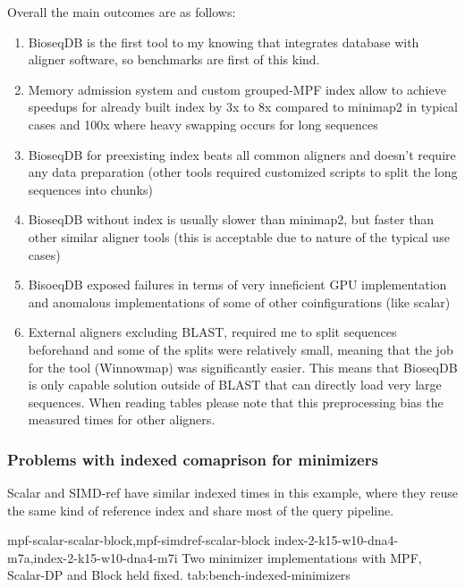 Overall the main outcomes are as follows:
\begin{enumerate}
  \item BioseqDB is the first tool to my knowing that integrates database with aligner software, so benchmarks are first of this kind.
  \item Memory admission system and custom grouped-MPF index allow to achieve speedups for already built index by 3x to 8x compared to minimap2 in typical cases and 100x where heavy swapping occurs for long sequences
  \item BioseqDB for preexisting index beats all common aligners and doesn't require any data preparation (other tools required customized scripts to split the long sequences into chunks)
  \item BioseqDB without index is usually slower than minimap2, but faster than other similar aligner tools (this is acceptable due to nature of the typical use cases)
  \item BisoeqDB exposed failures in terms of very inneficient GPU implementation and anomalous implementations of some of other coinfigurations (like scalar)
  \item External aligners excluding BLAST, required me to split sequences beforehand and some of the splits were relatively small, 
  meaning that the job for the tool (Winnowmap) was significantly easier. This means that BioseqDB is only capable solution outside of BLAST that can directly load very large sequences. When reading tables please note that this preprocessing 
  bias the measured times for other aligners.
\end{enumerate}

\subsubsection{Problems with indexed comaprison for minimizers}
\label{sec:bench-indexed-minimizers}

Scalar and SIMD-ref have similar indexed times in this example, where they
reuse the same kind of reference index and share most of the query pipeline.

  {mpf-scalar-scalar-block,mpf-simdref-scalar-block}
  {index-2-k15-w10-dna4-m7a,index-2-k15-w10-dna4-m7i}
  {Two minimizer implementations with MPF, Scalar-DP and Block held fixed.}
  {tab:bench-indexed-minimizers}


